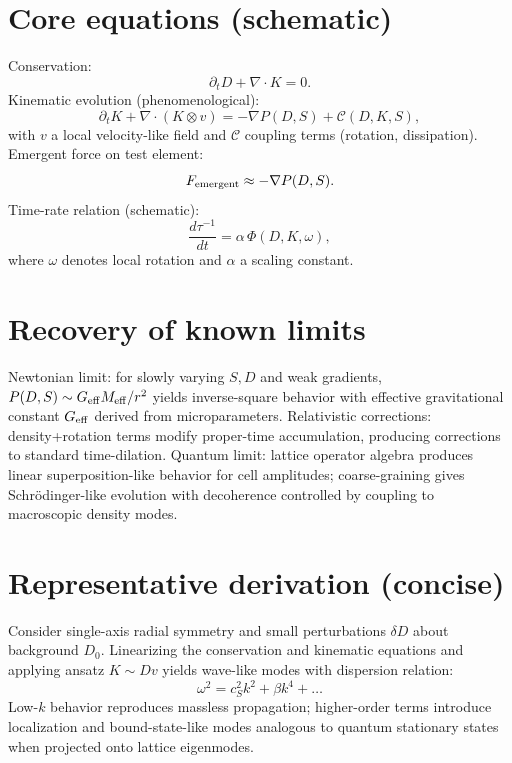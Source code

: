 \documentclass[10pt,twocolumn]{article}
\begin{document}
\section*{Core equations (schematic)}
Conservation:
\begin{equation}
\partial_t D + \nabla\cdot K = 0.
\end{equation}
Kinematic evolution (phenomenological):
\begin{equation}
\partial_t K + \nabla\cdot (K\otimes v) = -\nabla P(D,S) + \mathcal{C}(D,K,S),
\end{equation}
with $v$ a local velocity-like field and $\mathcal{C}$ coupling terms (rotation, dissipation). Emergent force on test element:
\begin{equation}
F_{\rm emergent} \approx -\nabla P(D,S).
\end{equation}
Time-rate relation (schematic):
\begin{equation}
\frac{d\tau^{-1}}{dt} = \alpha\,\Phi(D,K,\omega),
\end{equation}
where $\omega$ denotes local rotation and $\alpha$ a scaling constant.

\section*{Recovery of known limits}
Newtonian limit: for slowly varying $S,D$ and weak gradients, $P(D,S)\sim G_{\rm eff} M_{\rm eff} / r^2$ yields inverse-square behavior with effective gravitational constant $G_{\rm eff}$ derived from microparameters. Relativistic corrections: density+rotation terms modify proper-time accumulation, producing corrections to standard time-dilation. Quantum limit: lattice operator algebra produces linear superposition-like behavior for cell amplitudes; coarse-graining gives Schr\"odinger-like evolution with decoherence controlled by coupling to macroscopic density modes.

\section*{Representative derivation (concise)}
Consider single-axis radial symmetry and small perturbations $\delta D$ about background $D_0$. Linearizing the conservation and kinematic equations and applying ansatz $K\sim D v$ yields wave-like modes with dispersion relation:
\begin{equation}
\omega^2 = c_S^2 k^2 + \beta k^4 + \dots
\end{equation}
Low-$k$ behavior reproduces massless propagation; higher-order terms introduce localization and bound-state-like modes analogous to quantum stationary states when projected onto lattice eigenmodes.
\end{document}
